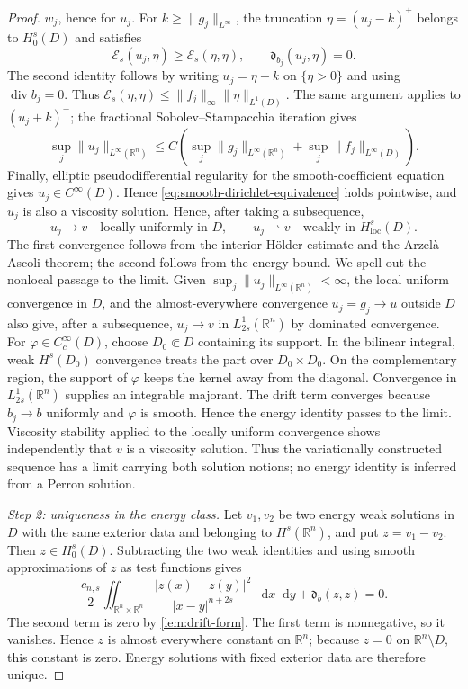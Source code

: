 \documentclass[reqno]{amsart}
\numberwithin{equation}{section}
\theoremstyle{plain}
\theoremstyle{definition}
\theoremstyle{remark}
\newcommand{\R}{\mathbb R}
\newcommand{\differential}{\mathop{}\!\mathrm d}
\DeclareMathOperator{\divergence}{div}
\newcommand{\rev}[1]{#1}
\begin{document}
\begin{proof}
$w_j$, hence for $u_j$.  For $k\ge\|g_j\|_{L^\infty}$, the truncation
$\eta=(u_j-k)^+$ belongs to $H_0^s(D)$ and satisfies
\[
 \mathcal E_s(u_j,\eta)\ge\mathcal E_s(\eta,\eta),
 \qquad \mathfrak d_{b_j}(u_j,\eta)=0.
\]
The second identity follows by writing $u_j=\eta+k$ on $\{\eta>0\}$
and using $\divergence b_j=0$.  Thus
$\mathcal E_s(\eta,\eta)\le\|f_j\|_\infty\|\eta\|_{L^1(D)}$.
The same argument applies to $(u_j+k)^-$; the fractional
Sobolev--Stampacchia iteration gives
\[
 \sup_j\|u_j\|_{L^\infty(\R^n)}
 \le C\left(\sup_j\|g_j\|_{L^\infty(\R^n)}
             +\sup_j\|f_j\|_{L^\infty(D)}\right).
\]
Finally, elliptic pseudodifferential regularity for
the smooth-coefficient equation gives $u_j\in C^\infty(D)$.  Hence
\eqref{eq:smooth-dirichlet-equivalence} holds pointwise, and $u_j$ is also
a viscosity solution.
Hence,
after taking a subsequence,
\begin{equation}\label{eq:two-compactness-modes}
 u_j\to v\quad\text{locally uniformly in }D,
 \qquad u_j\rightharpoonup v\quad\text{weakly in }H^s_{\mathrm{loc}}(D).
\end{equation}
The first convergence follows from the interior H\"older estimate and the
Arzel\`a--Ascoli theorem; the second follows from the energy bound.  We spell
out the nonlocal passage to the limit.  Given
$\sup_j\|u_j\|_{L^\infty(\R^n)}<\infty$, the local uniform convergence in
$D$, and the almost-everywhere convergence $u_j=g_j\to u$ outside $D$
also give, after a subsequence,
$u_j\to v$ in $L^1_{2s}(\R^n)$ by dominated convergence.  For
$\varphi\in C_c^\infty(D)$, choose $D_0\Subset D$ containing its support.
In the bilinear integral, weak $H^s(D_0)$ convergence treats the part over
$D_0\times D_0$.  \rev{On the complementary region, the support of
$\varphi$ keeps the kernel away from the diagonal.}  Convergence in
$L^1_{2s}(\R^n)$ supplies an integrable majorant.  The drift term converges
because $b_j\to b$ uniformly and $\varphi$ is smooth.  Hence the energy
identity passes to the limit.  Viscosity stability applied to the locally
uniform convergence shows independently that $v$ is a viscosity solution.
Thus the variationally constructed sequence has a limit carrying both
solution notions; no energy identity is inferred from a Perron solution.
\endgroup

\smallskip
\noindent\emph{Step 2: uniqueness in the energy class.}
Let $v_1,v_2$ be two energy weak solutions in $D$ with the same exterior
data and belonging to $H^s(\R^n)$, and put $z=v_1-v_2$.  Then
$z\in H_0^s(D)$.  Subtracting the two weak
identities and using smooth approximations of $z$ as test functions gives
\[
 \frac{c_{n,s}}2\iint_{\R^n\times\R^n}
 \frac{|z(x)-z(y)|^2}{|x-y|^{n+2s}}\,\differential x\differential y
 +\mathfrak d_b(z,z)=0.
\]
The second term is zero by \cref{lem:drift-form}.  The first term is
nonnegative, so it vanishes.  Hence $z$ is almost everywhere constant on
$\R^n$; because $z=0$ on $\R^n\setminus D$, this constant is zero.  Energy
solutions with fixed exterior data are therefore unique.


\end{proof}
\end{document}
